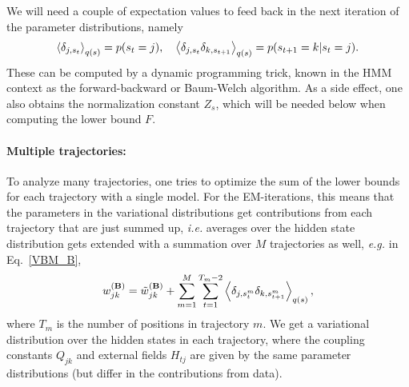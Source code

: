 We will need a couple of expectation values to feed back in the next
iteration of the parameter distributions, namely
\begin{equation}
  \left\langle \delta_{j,s_t}\right\rangle_{q(s)}=p(s_t=j),\quad
  \left\langle \delta_{j,s_t}\delta_{k,s_{t+1}}\right\rangle_{q(s)}=p(s_{t+1}=k|s_t=j).
\end{equation}
These can be computed by a dynamic programming
trick\cite{Bishop2006,Mackay1997,Beal2003}, known in the HMM context
as the forward-backward or Baum-Welch
algorithm\cite{Rabiner1989,Baum1972}. As a side effect, one also
obtains the normalization constant $Z_s$, which will be needed below
when computing the lower bound $F$.

\paragraph{Multiple trajectories:}
To analyze many trajectories, one tries to optimize the sum of the
lower bounds for each trajectory with a single model. For the
EM-iterations, this means that the parameters in the variational
distributions get contributions from each trajectory that are just
summed up, \textit{i.e.} averages over the hidden state distribution
gets extended with a summation over $M$ trajectories as
well, \textit{e.g.} in Eq.~\eqref{VBM_B},
\begin{equation}
w_{jk}^{(\mathbf{B})}=\tilde w_{jk}^{(\mathbf{B})}
  +\sum_{m=1}^M\sum_{t=1}^{T_m-2}\left\langle \delta_{j,s^m_t}\delta_{k,s^m_{t+1}}\right\rangle_{q(s)},
\end{equation}
where $T_m$ is the number of positions in trajectory $m$. We get a
variational distribution over the hidden states in each trajectory,
where the coupling constants $Q_{jk}$ and external fields $H_{tj}$ are
given by the same parameter distributions (but differ in the
contributions from data).


